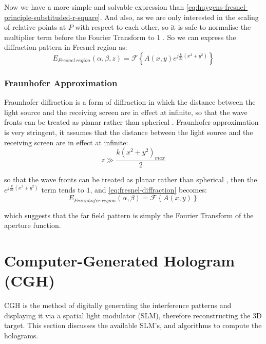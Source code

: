 Now we have a more simple and solvable expression than \cref{eq:huygens-fresnel-principle-substituded-r-square}. And also, as we are only interested in the scaling of relative points at $P$ with respect to each other, so it is safe to normalise the multiplier term before the Fourier Transform to 1 \cite{Wilkinson2019}. So we can express the diffraction pattern in Fresnel region as:
\begin{equation}
  E_{Fresnel\ region}(\alpha, \beta, z) = \mathcal{F} \left\{A(x,y)e^{j\frac{k}{2z}(x^2+y^2)}\right\} \label{eq:fresnel-diffraction}
\end{equation}


\subsubsection{Fraunhofer Approximation}
Fraunhofer diffraction is a form of diffraction in which the distance between the light source and the receiving screen are in effect at infinite, so that the wave fronts can be treated as planar rather than spherical \cite{Daintith2009}. Fraunhofer approximation is very stringent, it assumes that the distance between the light source and the receiving screen are in effect at infinite:
\begin{equation}
  z\gg \frac{k(x^2+y^2)_{max}}{2}
\end{equation}

so that the wave fronts can be treated as planar rather than spherical \cite{Daintith2009}, then the $e^{j\frac{k}{2z}(x^2+y^2)}$ term tends to $1$, and \cref{eq:fresnel-diffraction} becomes:
\begin{equation}
  E_{Fraunhofer\ region}(\alpha, \beta) = \mathcal{F} \left\{A(x,y)\right\}
\end{equation}

which suggests that the far field pattern is simply the Fourier Transform of the aperture function.



\newpage
\section{Computer-Generated Hologram (CGH)}\label{sec:cgh}
CGH is the method of digitally generating the interference patterns and displaying it via a spatial light modulator (SLM), therefore reconstructing the 3D target. This section discusses the available SLM's, and algorithms to compute the holograms.
